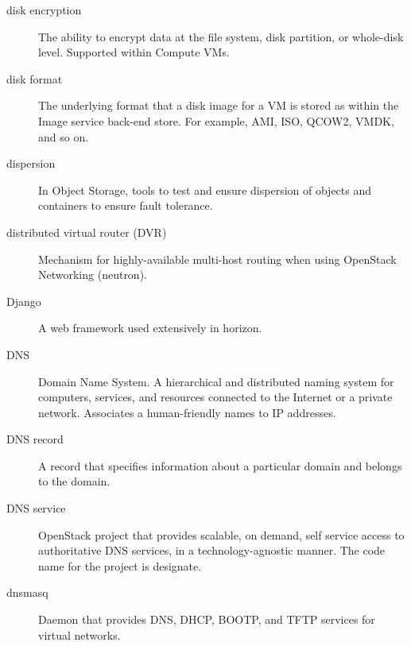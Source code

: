 \documentclass[letterpaper,10pt,english]{sphinxmanual}
\begin{document}
\begin{description}
\item[{disk encryption}] \leavevmode{}\label{_source/glossary:term-disk-encryption}
The ability to encrypt data at the file system, disk partition,
or whole-disk level. Supported within Compute VMs.

\item[{disk format}] \leavevmode{}\label{_source/glossary:term-disk-format}
The underlying format that a disk image for a VM is stored as
within the Image service back-end store. For example, AMI, ISO, QCOW2,
VMDK, and so on.

\item[{dispersion}] \leavevmode{}\label{_source/glossary:term-dispersion}
In Object Storage, tools to test and ensure dispersion of
objects and containers to ensure fault tolerance.

\item[{distributed virtual router (DVR)}] \leavevmode{}\label{_source/glossary:term-distributed-virtual-router-dvr}
Mechanism for highly-available multi-host routing when using
OpenStack Networking (neutron).

\item[{Django}] \leavevmode{}\label{_source/glossary:term-django}
A web framework used extensively in horizon.

\item[{DNS}] \leavevmode{}\label{_source/glossary:term-dns}
Domain Name System. A hierarchical and distributed naming system
for computers, services, and resources connected to the Internet or a
private network. Associates a human-friendly names to IP
addresses.

\item[{DNS record}] \leavevmode{}\label{_source/glossary:term-dns-record}
A record that specifies information about a particular domain
and belongs to the domain.

\item[{DNS service}] \leavevmode{}\label{_source/glossary:term-dns-service}
OpenStack project that provides scalable, on demand, self
service access to authoritative DNS services, in a
technology-agnostic manner. The code name for the project is
designate.

\item[{dnsmasq}] \leavevmode{}\label{_source/glossary:term-dnsmasq}
Daemon that provides DNS, DHCP, BOOTP, and TFTP services for
virtual networks.


\end{description}
\end{document}
